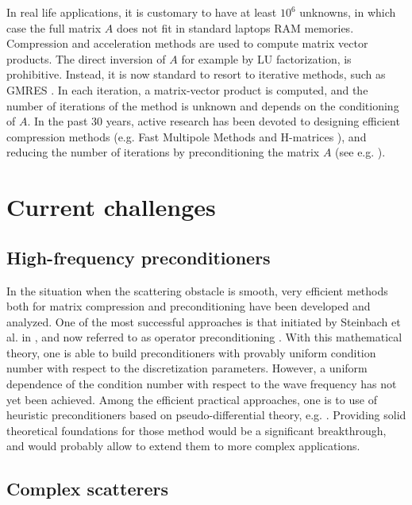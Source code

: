 \documentclass[]{article}
\begin{document}
In real life applications, it is customary to have at least $10^6$ unknowns, in which case the full matrix $A$ does not fit in standard laptops RAM memories. Compression and acceleration methods are used to compute matrix vector products. The direct inversion of $A$ for example by LU factorization, is prohibitive. Instead, it is now standard to resort to iterative methods, such as GMRES \cite{saad1986gmres}. In each iteration, a matrix-vector product is computed, and the number of iterations of the method is unknown and depends on the conditioning of $A$. In the past 30 years, active research has been devoted to designing efficient compression methods (e.g. Fast Multipole Methods \cite{greengard1987fast} and H-matrices \cite{hackbusch1999sparse}), and reducing the number of iterations by preconditioning the matrix $A$ (see e.g. \cite{steinbach1998construction}).

\section{Current challenges}


\subsection*{High-frequency preconditioners}

In the situation when the scattering obstacle is smooth, very efficient methods both for matrix compression and preconditioning have been developed and analyzed. One of the most successful approaches is that initiated by Steinbach et al. in \cite{steinbach1998construction}, and now referred to as operator preconditioning \cite{hiptmair2006operator}. With this mathematical theory, one is able to build preconditioners with provably uniform condition number with respect to the discretization parameters. However, a uniform dependence of the condition number with respect to the wave frequency has not yet been achieved. Among the efficient practical approaches, one is to use of heuristic preconditioners based on pseudo-differential theory, e.g. \cite{antoine2007generalized}. Providing solid theoretical foundations for those method would be a significant breakthrough, and would probably allow to extend them to more complex applications. 

\subsection*{Complex scatterers}
\end{document}
